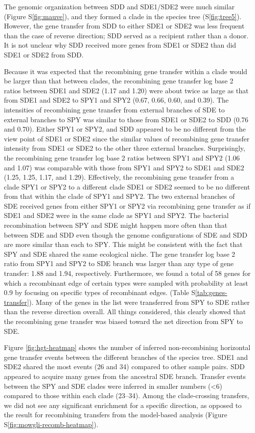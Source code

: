 \documentclass[english]{article}
\begin{document}
The genomic organization between SDD and SDE1/SDE2 were much similar (Figure
S\ref{fig:mauve}), and they formed a clade in the species tree
(S\ref{fig:tree5}). However, the gene transfer from SDD to either SDE1 or SDE2
was less frequent than the case of reverse direction; SDD served as a recipient
rather than a donor. It is not unclear why SDD received more genes from SDE1 or
SDE2 than did SDE1 or SDE2 from SDD. 

Because it was expected that the recombining gene transfer within a clade would
be larger than that between clades, the recombining gene transfer log base 2
ratios between SDE1 and SDE2 (1.17 and 1.20) were about twice as large as that
from SDE1 and SDE2 to SPY1 and SPY2 (0.67, 0.66, 0.60, and 0.39).  The
intensities of recombining gene transfer from external branches of SDE to
external branches to SPY was similar to those from SDE1 or SDE2 to SDD (0.76 and
0.70).  Either SPY1 or SPY2, and SDD appeared to be no different from the view
point of SDE1 or SDE2 since the similar values of recombining gene transfer
intensity from SDE1 or SDE2 to the other three external branches.  Surprisingly,
the recombining gene transfer log base 2 ratios between SPY1 and SPY2 (1.06 and
1.07) was comparable with those from SPY1 and SPY2 to SDE1 and SDE2 (1.25, 1.25,
1.17, and 1.29).  Effectively, the recombining gene transfer from a clade SPY1
or SPY2 to a different clade SDE1 or SDE2 seemed to be no different from that
within the clade of SPY1 and SPY2. The two external branches of SDE received
genes from either SPY1 or SPY2 via recombining gene transfer as if SDE1 and SDE2
were in the same clade as SPY1 and SPY2.  The bacterial recombination between
SPY and SDE might happen more often than that between SDE and SDD even though
the genome configurations of SDE and SDD are more similar than each to SPY. This
might be consistent with the fact that SPY and SDE shared the same ecological
niche.  The gene transfer log base 2 ratio from SPY1 and SPY2 to SDE branch was
larger than any type of gene transfer: 1.88 and 1.94, respectively.  
Furthermore, we found a total of 58 genes for which a recombinant edge of
certain types were sampled with probability at least 0.9 by focusing on specific
types of recombinant edges.  (Table S\ref{tab:genes-transfer}).  Many of the
genes in the list were transferred from SPY to SDE rather than the reverse
direction overall.  All things considered, this clearly showed that the
recombining gene transfer was biased toward the net direction from SPY to SDE.

Figure \ref{fig:hgt-heatmap} shows the number of inferred non-recombining
horizontal gene transfer events between the different branches of the species
tree.  SDE1 and SDE2 shared the most events (26 and 34) compared to other sample
pairs.  SDD appeared to acquire many genes from the ancestral SDE branch.
Transfer events between the SPY and SDE clades were inferred in smaller numbers
(<6) compared to those within each clade (23--34). Among the clade-crossing
transfers, we did not see any significant enrichment for a specific direction,
as opposed to the result for recombining transfers from the model-based analysis
(Figure S\ref{fig:mowgli-recomb-heatmap}).
\end{document}
